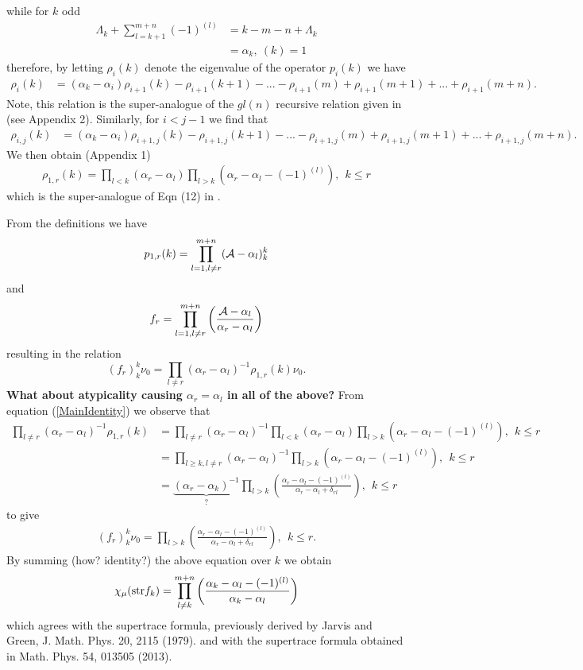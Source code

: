 \documentclass[12pt]{article}
\def\nn{\nonumber}
\begin{document}
while for $k$ odd
\begin{align*}
\Lambda_k + \sum_{l=k+1}^{m+n} (-1)^{(l)} &= k - m - n + \Lambda_k \\
&= \alpha_k, ~(k) = 1
\end{align*}
therefore, by letting $\rho_i(k)$ denote the eigenvalue of the operator $p_i(k)$ we have 
\begin{align}
\rho_i(k) &= (\alpha_k - \alpha_i)\rho_{i+1}(k) - \rho_{i+1}(k+1) - ... - \rho_{i+1}(m) + \rho_{i+1}(m+1) +...+ \rho_{i+1}(m+n) \nn.
\end{align}
Note, this relation is the super-analogue of the $gl(n)$ recursive relation given in \cite{Gould1978} (see Appendix 2).
Similarly, for $i<j-1$ we find that
\begin{align}
\rho_{i,j}(k) &= (\alpha_k - \alpha_i)\rho_{i+1,j}(k) - \rho_{i+1,j}(k+1) - ... - \rho_{i+1,j}(m) + \rho_{i+1,j}(m+1) +...+ \rho_{i+1,j}(m+n) \nn.
\end{align}
We then obtain (Appendix 1)
\begin{align}
\rho_{1,r}(k) = \prod_{l < k} (\alpha_r - \alpha_l) \prod_{l > k} (\alpha_r - \alpha_l - (-1)^{(l)}),~~k \leq r
\label{MainIdentity}
\end{align}
which is the super-analogue of Eqn (12) in \cite{Gould1978}.

From the definitions we have
$$
p_{1,r}(k) = \prod^{m+n}_{l=1,l \neq r} ({\cal A} - \alpha_l)^k_k
$$
and
$$
f_r = \prod_{l=1,l \neq r}^{m+n} \left( \frac{{\cal A} - \alpha_l}{\alpha_r - \alpha_l}  \right)
$$
resulting in the relation
$$
(f_r)^k_k \nu_0 = \prod_{l \neq r}(\alpha_r - \alpha_l)^{-1} \rho_{1,r}(k) \nu_0.
$$
\textbf{What about atypicality causing $\alpha_r = \alpha_l$ in all of the above?}
From equation (\ref{MainIdentity}) we observe that
\begin{align*}
\prod_{l \neq r}(\alpha_r - \alpha_l)^{-1} \rho_{1,r}(k) &= \prod_{l \neq r}(\alpha_r - \alpha_l)^{-1} \prod_{l < k} (\alpha_r - \alpha_l) \prod_{l > k} (\alpha_r - \alpha_l - (-1)^{(l)}),~~k \leq r \\
&= \prod_{l \geq k,l \neq r}(\alpha_r - \alpha_l)^{-1} \prod_{l > k} (\alpha_r - \alpha_l - (-1)^{(l)}),~~k \leq r \\
&= \underbrace{(\alpha_r - \alpha_k)^{-1}}_{?} 
\prod_{l > k} \left( \frac{\alpha_r - \alpha_l - (-1)^{(l)} }{\alpha_r - \alpha_l + \delta_{rl} } \right),~~k \leq r 
\end{align*}
to give
\begin{align}
(f_r)^k_k \nu_0 = \prod_{l > k} \left( \frac{\alpha_r - \alpha_l - (-1)^{(l)} }{\alpha_r - \alpha_l + \delta_{rl} } \right),~~k \leq r .
\label{Projection_kk}
\end{align}
By summing (how? identity?) the above equation over $k$ we obtain
$$
\chi_\mu(\hbox{str} f_k) = \prod_{l \neq k}^{m+n} \left( \frac{\alpha_k - \alpha_l - (-1)^{(l)} }{\alpha_k - \alpha_l} \right)
$$
which agrees with the supertrace formula, previously derived by Jarvis and Green, J. Math. Phys. 20, 2115 (1979). and with the supertrace formula obtained in Math. Phys. 54, 013505 (2013).
\end{document}
